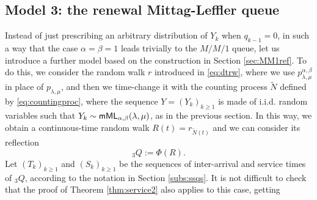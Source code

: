 \documentclass[]{amsart}
\numberwithin{equation}{section}
\theoremstyle{remark}
\theoremstyle{definition}
\DeclareMathOperator{\bP}{\mathbb{P}}
\begin{document}
\subsection{Model 3: the renewal Mittag-Leffler queue}\label{Sec:model3}
{Instead of just prescribing an arbitrary distribution of $Y_k$ when $q_{k-1}=0$, in such a way that the case $\alpha=\beta=1$ leads trivially to the $M/M/1$ queue, let us introduce a further model based on the construction in Section \ref{sec:MM1ref}. To do this, we consider the random walk $r$ introduced in \eqref{eq:dtrw}, where we use $p_{\lambda,\mu}^{\alpha,\beta}$ in place of $p_{\lambda,\mu}$, and then we time-change it with the counting process $\widetilde{N}$ defined by \eqref{eq:countingproc}, where the sequence $Y=(Y_k)_{k \ge 1}$ is made of i.i.d. random variables such that $Y_k \sim {\sf mML}_{\alpha,\beta}(\lambda,\mu)$, as in the previous section. In this way, we obtain a continuous-time random walk $R(t)=r_{\widetilde{N}(t)}$ and we can consider its reflection
\begin{equation*}
	{}_3Q:=\Phi(R).
\end{equation*}}
Let $(T_k)_{k \ge 1}$ and $(S_k)_{k \ge 1}$ be the sequences of inter-arrival and service times of ${}_3Q$, according to the notation in Section \ref{subs:ssqs}. It is not difficult to check that the proof of Theorem \ref{thm:service2} also applies to this case, getting
\end{document}
